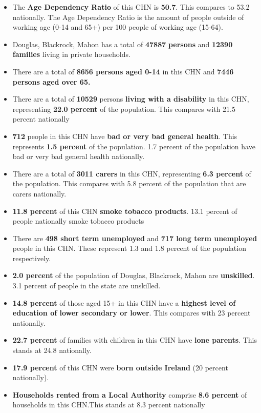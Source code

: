 \documentclass{article}
\begin{document}
\begin{itemize}

\item The \textbf{Age Dependency Ratio} of this CHN is  \textbf{50.7}. This compares to 53.2 nationally. The Age Dependency Ratio is the amount of people outside of working age (0-14 and 65+) per 100 people of working age (15-64). 

\item Douglas, Blackrock, Mahon has a total of \textbf{\num{47887}} \textbf{persons} and  \textbf{\num{12390}} \textbf{families} living in private households.

\item There are a total of \textbf{\num{8656} persons aged 0-14} in this CHN and \textbf{\num{7446} persons aged over 65.} 

\item There are a total of \textbf{\num{10529}} persons \textbf{living with a disability} in this CHN, representing \textbf{22.0 percent} of the population. This compares with  21.5 percent nationally

\item \textbf{\num{712}} people in this CHN have \textbf{bad or very bad general health}. This represents \textbf{1.5 percent} of the population. 1.7 percent of the population have bad or very bad general health nationally. 

\item There are a total of \textbf{\num{3011} carers} in this CHN, representing \textbf{6.3 percent} of the population. This compares with 5.8 percent of the population that are carers nationally. 

\item \textbf{11.8 percent} of this CHN \textbf{smoke tobacco products}. 13.1 percent of people nationally smoke tobacco products

\item There are \textbf{\num{498} short term unemployed} and \textbf{\num{717} long term unemployed} people in this CHN. These represent 1.3 and 1.8 percent of the population respectively.

\item  \textbf{2.0 percent} of the population of Douglas, Blackrock, Mahon are \textbf{unskilled}. 3.1 percent of people in the state are unskilled.

\item \textbf{14.8 percent} of those aged 15+ in this CHN have a \textbf{highest level of education of lower secondary or lower}. This compares with 23 percent nationally. 

\item \textbf{22.7 percent} of families with children in this CHN have \textbf{lone parents}. This stands at 24.8 nationally.

\item \textbf{17.9 percent} of this CHN were \textbf{born outside Ireland} (20 percent nationally).

\item \textbf{Households rented from a Local Authority} comprise \textbf{8.6 percent} of households in this CHN.This stands at 8.3 percent nationally

\end{itemize}
\end{document}
